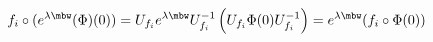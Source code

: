 \begin{equation}
f_i \circ (e^{\lambda\mbw}(\Phi)(0))=
U_{f_i}e^{\lambda\mbw}U_{f_i}^{-1}\left(
U_{f_i}\Phi(0)U_{f_i}^{-1}\right)=e^{\lambda\mbw}(
f_i \circ \Phi(0)) \ 
\end{equation}


